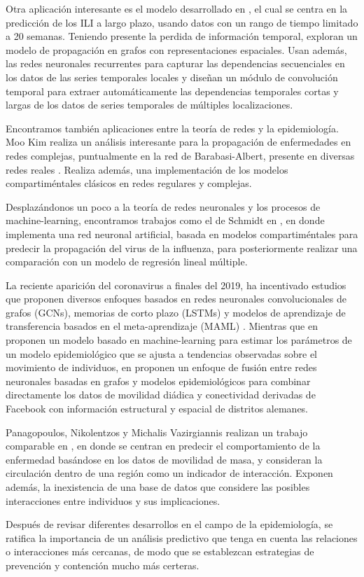Otra aplicación interesante es el modelo desarrollado en \cite{colaGNN}, el cual se centra en la predicción de los ILI a largo plazo, usando datos con un rango de tiempo limitado a 20 semanas. Teniendo presente la perdida de información temporal, exploran un modelo de propagación en grafos con representaciones espaciales. Usan además, las redes neuronales recurrentes para capturar las dependencias secuenciales en los datos de las series temporales locales y diseñan un módulo de convolución temporal para extraer automáticamente las dependencias temporales cortas y largas de los datos de series temporales de múltiples localizaciones.

Encontramos también aplicaciones entre la teoría de redes y la epidemiología. Moo Kim realiza un análisis interesante para la propagación de enfermedades en redes complejas, puntualmente en la red de Barabasi-Albert, presente en diversas redes reales \cite{redesComplejas}. Realiza además, una implementación de los modelos compartiméntales clásicos en redes regulares y complejas.

Desplazándonos un poco a la teoría de redes neuronales y los procesos de machine-learning, encontramos trabajos como el de Schmidt en \cite{schmidt2019}, en donde implementa una red neuronal artificial, basada en modelos compartiméntales para predecir la propagación del virus de la influenza, para posteriormente realizar una comparación con un modelo de regresión lineal múltiple.

La reciente aparición del coronavirus a finales del 2019, ha incentivado estudios que proponen diversos enfoques basados en redes neuronales convolucionales de grafos (GCNs), memorias de corto plazo (LSTMs) y modelos de aprendizaje de transferencia basados en el meta-aprendizaje (MAML) \cite{combiningGraph, epidemiologicalNeuralNetwork}. Mientras que en \cite{epidemiologicalNeuralNetwork} proponen un modelo basado en machine-learning para estimar los parámetros de un modelo epidemiológico que se ajusta a tendencias observadas sobre el movimiento de individuos, en \cite{combiningGraph} proponen un enfoque de fusión entre redes neuronales basadas en grafos y modelos epidemiológicos para combinar directamente los datos de movilidad diádica y conectividad derivadas de Facebook con información estructural y espacial de distritos alemanes.

Panagopoulos, Nikolentzos y Michalis Vazirgiannis realizan un trabajo comparable en \cite{transfer2021}, en donde se centran en predecir el comportamiento de la enfermedad basándose en los datos de movilidad de masa, y consideran la circulación dentro de una región como un indicador de interacción. Exponen además, la inexistencia de una base de datos que considere las posibles interacciones entre individuos y sus implicaciones.

Después de revisar diferentes desarrollos en el campo de la epidemiología, se ratifica la importancia de un análisis predictivo que tenga en cuenta las relaciones o interacciones más cercanas, de modo que se establezcan estrategias de prevención y contención mucho más certeras.
